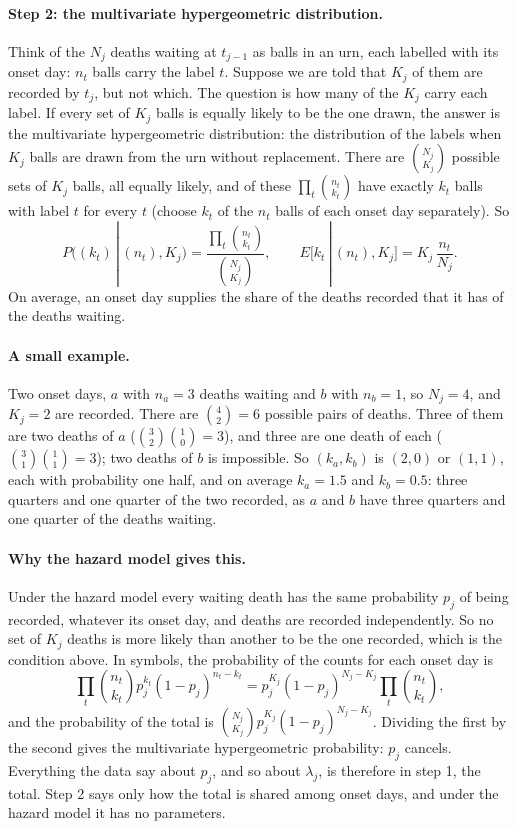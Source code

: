\documentclass[11pt,a4paper]{article}
\newcommand{\given}{\,|\,}
\begin{document}
\paragraph{Step 2: the multivariate hypergeometric distribution.} Think of
the $N_j$ deaths waiting at $t_{j-1}$ as balls in an urn, each labelled with
its onset day: $n_t$ balls carry the label $t$. Suppose we are told that
$K_j$ of them are recorded by $t_j$, but not which. The question is how many
of the $K_j$ carry each label. If every set of $K_j$ balls is equally likely
to be the one drawn, the answer is the multivariate hypergeometric
distribution: the distribution of the labels when $K_j$ balls are drawn from
the urn without replacement. There are $\binom{N_j}{K_j}$ possible sets of
$K_j$ balls, all equally likely, and of these
$\prod_t\binom{n_t}{k_t}$ have exactly $k_t$ balls with label $t$ for every
$t$ (choose $k_t$ of the $n_t$ balls of each onset day separately). So
\[
P\bigl((k_t)\given(n_t),K_j\bigr)=\frac{\prod_t\binom{n_t}{k_t}}{\binom{N_j}{K_j}},
\qquad
E\bigl[k_t\given(n_t),K_j\bigr]=K_j\,\frac{n_t}{N_j}.
\]
On average, an onset day supplies the share of the deaths recorded that it
has of the deaths waiting.

\paragraph{A small example.} Two onset days, $a$ with $n_a=3$ deaths waiting
and $b$ with $n_b=1$, so $N_j=4$, and $K_j=2$ are recorded. There are
$\binom{4}{2}=6$ possible pairs of deaths. Three of them are two deaths of
$a$ ($\binom32\binom10=3$), and three are one death of each
($\binom31\binom11=3$); two deaths of $b$ is impossible. So $(k_a,k_b)$ is
$(2,0)$ or $(1,1)$, each with probability one half, and on average
$k_a=1.5$ and $k_b=0.5$: three quarters and one quarter of the two recorded,
as $a$ and $b$ have three quarters and one quarter of the deaths waiting.

\paragraph{Why the hazard model gives this.} Under the hazard model every
waiting death has the same probability $p_j$ of being recorded, whatever its
onset day, and deaths are recorded independently. So no set of $K_j$ deaths
is more likely than another to be the one recorded, which is the condition
above. In symbols, the probability of the counts for each onset day is
\[
\prod_t\binom{n_t}{k_t}p_j^{k_t}(1-p_j)^{n_t-k_t}
=p_j^{K_j}(1-p_j)^{N_j-K_j}\prod_t\binom{n_t}{k_t},
\]
and the probability of the total is
$\binom{N_j}{K_j}p_j^{K_j}(1-p_j)^{N_j-K_j}$. Dividing the first by the second
gives the multivariate hypergeometric probability: $p_j$ cancels. Everything
the data say about $p_j$, and so about $\lambda_j$, is therefore in step 1,
the total. Step 2 says only how the total is shared among onset days, and
under the hazard model it has no parameters.
\end{document}
